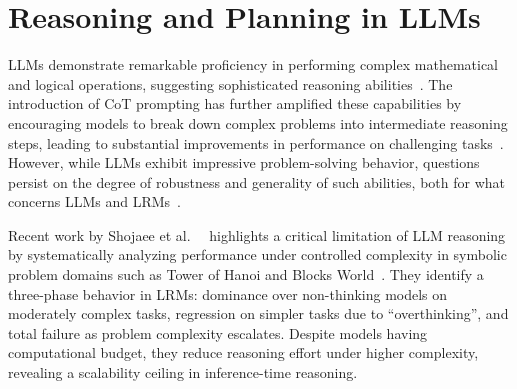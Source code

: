 \documentclass[12pt,a4paper,openright,twoside]{book}
\begin{document}
\section{Reasoning and Planning in LLMs}\label{sec:llm-reasoning}

LLMs demonstrate remarkable proficiency in performing complex mathematical and logical operations, suggesting sophisticated reasoning abilities~\cite{huangReasoningLargeLanguage2023}.
%
The introduction of \ac{CoT} prompting has further amplified these capabilities by encouraging models to break down complex problems into intermediate reasoning steps, leading to substantial improvements in performance on challenging tasks~\cite{weiChainofThoughtPromptingElicits2023, kojimaLargeLanguageModels2023}.
%
However, while LLMs exhibit impressive problem-solving behavior, questions persist on the degree of robustness and generality of such abilities, both for what concerns \acp{LLM} and \acp{LRM}~\cite{mccoyEmbersAutoregressionUnderstanding2023, mccoyWhenLanguageModel2024, wuReasoningRecitingExploring2024}. 

Recent work by Shojaee et al.\ ~\cite{shojaeeIllusionThinkingUnderstanding} highlights a critical limitation of \ac{LLM} reasoning by systematically analyzing performance under controlled complexity in symbolic problem domains such as Tower of Hanoi and Blocks World~\cite{DBLP:journals/ai/SlaneyT01}.
%
They identify a three-phase behavior in \acp{LRM}: dominance over non-thinking models on moderately complex tasks, regression on simpler tasks due to ``overthinking'', and total failure as problem complexity escalates. Despite models having computational budget, they reduce reasoning effort under higher complexity, revealing a scalability ceiling in inference-time reasoning.
\end{document}
